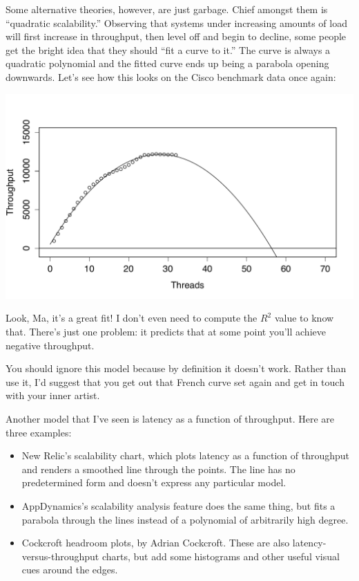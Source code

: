\documentclass{vivid_layout}
\begin{document}
Some alternative theories, however, are just garbage. Chief amongst them is
``quadratic scalability.'' Observing that systems under increasing amounts of
load will first increase in throughput, then level off and begin to decline,
some people get the bright idea that they should ``fit a curve to it.'' The curve
is always a quadratic polynomial and the fitted curve ends up being a parabola
opening downwards. Let's see how this looks on the Cisco benchmark data 
once again:
\begin{center}
\includegraphics[width=.85\linewidth]{scalability/quadratic}
\end{center}

Look, Ma, it's a great fit! I don't even need to compute the $R^2$ value to know
that. There's just one problem: it predicts that at some point you'll achieve
negative throughput.

You should ignore this model because by definition it doesn't work. Rather than
use it, I'd suggest that you get out that French curve set again and get in
touch with your inner artist.

Another model that I've seen is latency as a function of throughput. Here
are three examples:

\begin{itemize}
\item New Relic's scalability chart, which plots latency as a function of
throughput and renders a smoothed line through the points. The line has no
predetermined form and doesn't express any particular model.
\item AppDynamics's scalability analysis feature does the same thing, but fits a
parabola through the lines instead of a polynomial of arbitrarily high degree.
\item Cockcroft headroom plots, by Adrian Cockcroft. These are also
latency-versus-throughput charts, but add some histograms and other useful
visual cues around the edges.
\end{itemize}
\end{document}
